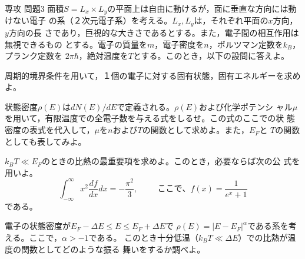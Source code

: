 \documentclass[fleqn]{jbook}
\begin{document}
\begin{question}{専攻 問題3}{}
面積$S=L_x\times L_y$の平面上は自由に動けるが，面に垂直な方向には動けない電子
の系（２次元電子系）を考える。$L_x,L_y$は，それぞれ平面の$x$方向，$y$方向の長
さであり，巨視的な大きさであるとする。また，電子間の相互作用は無視できるもの
とする。電子の質量を$m$，電子密度を$n$，ボルツマン定数を$k_B$，プランク定数を
$2\pi\hbar$，絶対温度を$T$とする。このとき，以下の設問に答えよ。

\begin{subquestions}
\SubQuestion
周期的境界条件を用いて，１個の電子に対する固有状態，固有エネルギーを求めよ。

\SubQuestion
状態密度$\rho(E)$は$dN(E)/dE$で定義される。$\rho(E)$および化学ポテンシ
ャル$\mu$を用いて，有限温度での全電子数を与える式をしるせ。この式のここでの状
態密度の表式を代入して，$\mu$を$n$および$T$の関数として求めよ。また，$E_F$と
$T$の関数としても表してみよ。

\SubQuestion
$k_BT\ll E_F$のときの比熱の最重要項を求めよ。このとき，必要ならば次の公
式を用いよ。
\[\int_{-\infty}^{\infty}x^2\frac{df}{dx}dx=-\frac{\pi^2}{3},
\hspace{1cm} ここで、f(x)=\frac{1}{e^x+1}\] である。

\SubQuestion
電子の状態密度が$E_F-\Delta E\leq E\leq E_F+\Delta E$で
$\rho(E)=|E-E_F|^{\alpha}$である系を考える。ここで，$\alpha>-1$である。
このとき十分低温（$k_BT\ll\Delta E$）での比熱が温度の関数としてどのような振る
舞いをするか調べよ。

\end{subquestions}
\end{question}
\end{document}

